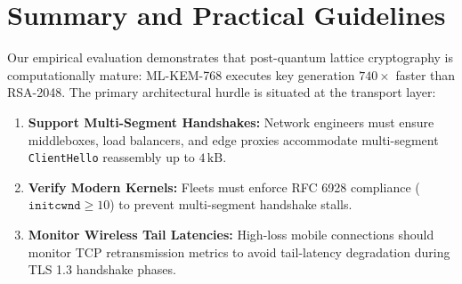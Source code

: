 \section{Summary and Practical Guidelines}
Our empirical evaluation demonstrates that post-quantum lattice cryptography is computationally mature: ML-KEM-768 executes key generation $740\times$ faster than RSA-2048. The primary architectural hurdle is situated at the transport layer:
\begin{enumerate}
    \item \textbf{Support Multi-Segment Handshakes:} Network engineers must ensure middleboxes, load balancers, and edge proxies accommodate multi-segment \texttt{ClientHello} reassembly up to $4\,\mathrm{kB}$.
    \item \textbf{Verify Modern Kernels:} Fleets must enforce RFC 6928 compliance ($\texttt{initcwnd} \ge 10$) to prevent multi-segment handshake stalls.
    \item \textbf{Monitor Wireless Tail Latencies:} High-loss mobile connections should monitor TCP retransmission metrics to avoid tail-latency degradation during TLS 1.3 handshake phases.
\end{enumerate}
